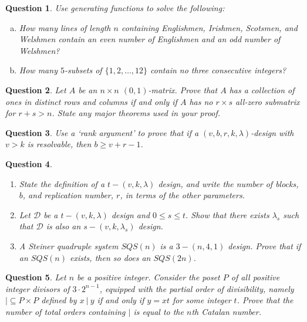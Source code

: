 \documentclass[12]{article}
\newtheorem{question}{Question}
\theoremstyle{definition}
\begin{document}
	\begin{question}
		Use generating functions to solve the following:
		\begin{enumerate}[a)]
			\item How many lines of length $n$ containing Englishmen, Irishmen, Scotsmen, and Welshmen contain an even number of Englishmen and an odd number of Welshmen?
			\item How many $5$-subsets of $\{1, 2, \ldots, 12\}$ contain no three consecutive integers?
		\end{enumerate}
	\end{question}

	\begin{question}
		Let $A$ be an $n \times n$ $(0,1)$-matrix.  Prove that $A$ has a collection of ones in distinct rows and columns if and only if $A$ has no $r \times s$ all-zero submatrix for $r+s > n$.  State any major theorems used in your proof.
	\end{question}

	\begin{question}
		Use a `rank argument' to prove that if a $(v, b, r, k, \lambda)$-design with $v > k$ is resolvable, then $b \geq v+r-1$.
	\end{question}

	\begin{question}
		\
		\begin{enumerate}
			\item State the definition of a $t-(v,k,\lambda)$ design, and write the number of blocks, $b$, and replication number, $r$, in terms of the other parameters.
			\item Let $\mathcal{D}$ be a $t-(v,k,\lambda)$ design and $0 \leq s \leq t$.  Show that there exists $\lambda_s$ such that $\mathcal{D}$ is also an $s-(v,k,\lambda_s)$ design.
			\item A Steiner quadruple system $SQS(n)$ is a $3-(n,4,1)$ design.  Prove that if an $SQS(n)$ exists, then so does an $SQS(2n)$.
		\end{enumerate}
	\end{question}

	\begin{question}
		Let $n$ be a positive integer.  Consider the poset $P$ of all positive integer divisors of $3 \cdot 2^{n-1}$, equipped with the partial order of divisibility, namely $|\subseteq P \times P$ defined by $x \ | \ y$ if and only if $y = xt$ for some integer $t$.  Prove that the number of total orders containing $|$ is equal to the $n$th Catalan number.
	\end{question}
\end{document}
